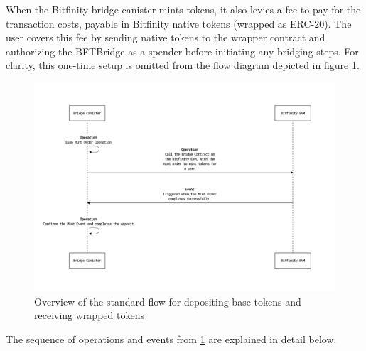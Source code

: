 \documentclass{article}
\begin{document}
When the Bitfinity bridge canister mints tokens, it also levies a fee to pay for the transaction costs, payable in Bitfinity native tokens (wrapped as ERC-20). The user covers this fee by sending native tokens to the wrapper contract and authorizing the BFTBridge as a spender before initiating any bridging steps. For clarity, this one-time setup is omitted from the flow diagram depicted in figure \ref{fig:standard_deposit}.

\begin{figure}[H]
    \centering
    \includegraphics[width=1\textwidth]{standard_deposit.png}
    \caption{Overview of the standard flow for depositing base tokens and receiving wrapped tokens}
    \label{fig:standard_deposit}
\end{figure}

The sequence of operations  and events from \ref{fig:standard_deposit} are explained in detail below.
\end{document}
